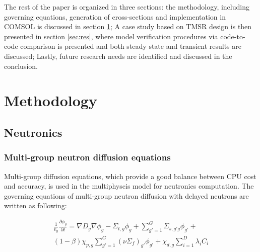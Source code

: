 \documentclass{elsarticle}
\begin{document}
The rest of the paper is organized in three sections: the methodology, including governing equations, generation of cross-sections and implementation in COMSOL is discussed in section \ref{sec:methodology}; A case study based on TMSR design is then presented in section \ref{sec:res}, where model verification procedures via code-to-code comparison is presented and both steady state and transient results are discussed; Lastly, future research needs are identified and discussed in the conclusion.

\section{Methodology}
\label{sec:methodology}

\subsection{Neutronics}
\subsubsection{Multi-group neutron diffusion equations}
Multi-group diffusion equations, which provide a good balance between CPU cost and accuracy, is used in the multiphyscis model for neutronics computation. The governing equations of multi-group neutron diffusion with delayed neutrons are written as following:

\begin{align}
    \frac{1}{v_g}\frac{\partial \phi_g}{\partial t} = \nabla D_g \nabla \phi_g - \Sigma_{t,g}\phi_g + \sum_{g'=1}^{G} \Sigma_{s, g'g}\phi_{g'} +  \nonumber \\
    (1-\beta)\chi_{p,g}\sum_{g'=1}^G(\nu \Sigma_f)_{g'} \phi_{g'} + \chi_{d,g}\sum_{i=1}^D \lambda_iC_i
\label{eq:diffusion}
  \end{align}
\end{document}
